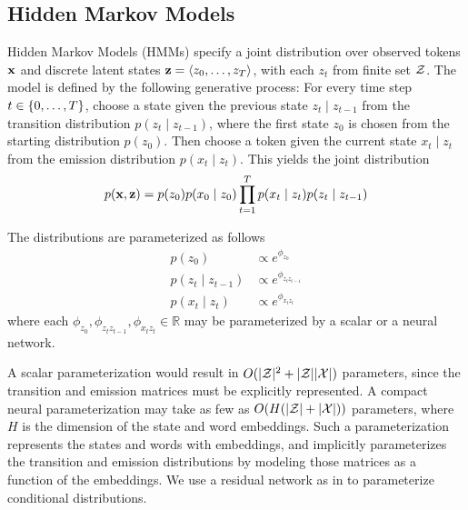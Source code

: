 \documentclass[11pt,a4paper]{article}
\begin{document}
\subsection{Hidden Markov Models}
Hidden Markov Models (HMMs) specify a joint distribution over 
observed tokens $\mathbf{x}$ and discrete latent states $\mathbf{z} = \langle z_0, \ldots, z_T \rangle$,
with each $z_t$ from finite set $\mathcal{Z}$.
The model is defined by the following generative process:
For every time step $t \in \left\{0,\ldots,T\right\}$, choose a state given the previous state
$z_t \mid z_{t-1}$ from the transition distribution $p(z_t \mid z_{t-1})$,
where the first state $z_0$ is chosen from the starting distribution $p(z_0)$.
Then choose a token given the current state $x_t \mid z_t$ from the emission distribution $p(x_t \mid z_t)$.
This yields the joint distribution
\begin{equation}
p(\mathbf{x}, \mathbf{z})
= p(z_0)p(x_0 \mid z_0)\prod_{t=1}^T p(x_t\mid z_t)p(z_t \mid z_{t-1})
\end{equation}



The distributions are parameterized as follows
\begin{equation}
\label{param}
\begin{aligned}
p(z_0) &\propto e^{\phi_{z_0}}\\
p(z_t \mid z_{t-1}) &\propto e^{\phi_{z_tz_{t-1}}}\\
p(x_t \mid z_t) &\propto e^{\phi_{x_tz_t}}
\end{aligned}
\end{equation}
where each $\phi_{z_0},\phi_{z_tz_{t-1}},\phi_{x_tz_t} \in \mathbb{R}$
may be parameterized by a scalar or a neural network.

A scalar parameterization would result in $O(|\mathcal{Z}|^2 + |\mathcal{Z}||\mathcal{X}|)$ parameters,
since the transition and emission matrices must be explicitly represented.
A compact neural parameterization may take as few as $O(H(|\mathcal{Z}| + |\mathcal{X}|))$ parameters,
where $H$ is the dimension of the state and word embeddings.
Such a parameterization represents the states and words with embeddings,
and implicitly parameterizes the transition and emission distributions
by modeling those matrices as a function of the embeddings.
We use a residual network as in \citet{kim2019cpcfg} to parameterize conditional distributions.
\end{document}
